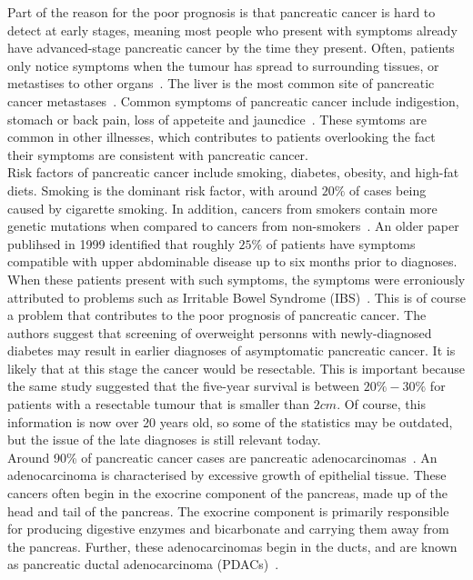 Part of the reason for the poor prognosis is that pancreatic cancer is hard to detect at early stages, meaning most people who present with symptoms already have advanced-stage pancreatic cancer by the time they present. Often, patients only notice symptoms when the tumour has spread to surrounding tissues, or metastises to other organs~\cite{kelsen}. The liver is the most common site of pancreatic cancer metastases~\cite{deeb}. Common symptoms of pancreatic cancer include indigestion, stomach or back pain, loss of appeteite and jauncdice~\cite{pancSymp}. These symtoms are common in other illnesses, which contributes to patients overlooking the fact their symptoms are consistent with pancreatic cancer. \\

Risk factors of pancreatic cancer include smoking, diabetes, obesity, and high-fat diets. Smoking is the dominant risk factor, with around $20\%$ of cases being caused by cigarette smoking. In addition, cancers from smokers contain more genetic mutations when compared to cancers from non-smokers~\cite{blackford}. An older paper publihsed in 1999 identified that roughly $25\%$ of patients have symptoms compatible with upper abdominable disease up to six months prior to diagnoses. When these patients present with such symptoms, the symptoms were erroniously attributed to problems such as Irritable Bowel Syndrome (IBS)~\cite{dimagno}. This is of course a problem that contributes to the poor prognosis of pancreatic cancer. The authors suggest that screening of overweight personns with newly-diagnosed diabetes may result in earlier diagnoses of asymptomatic pancreatic cancer. It is likely that at this stage the cancer would be resectable. This is important because the same study suggested that the five-year survival is between $20\%-30\%$ for patients with a resectable tumour that is smaller than $2cm$. Of course, this information is now over 20 years old, so some of the statistics may be outdated, but the issue of the late diagnoses is still relevant today. \\

Around 90\% of pancreatic cancer cases are pancreatic adenocarcinomas~\cite{pishvaian}. An adenocarcinoma is characterised by excessive growth of epithelial tissue. These cancers often begin in the exocrine component of the pancreas, made up of the head and tail of the pancreas. The exocrine component is primarily responsible for producing digestive enzymes and bicarbonate and carrying them away from the pancreas. Further, these adenocarcinomas begin in the ducts, and are known as pancreatic ductal adenocarcinoma (PDACs)~\cite{neoptolemos}. \\

